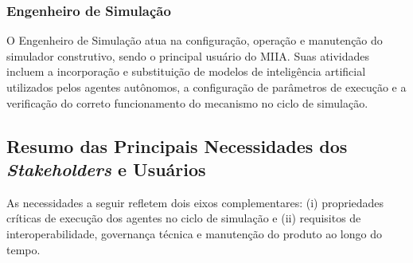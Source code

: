 \subsubsection{Engenheiro de Simulação}

O Engenheiro de Simulação atua na configuração, operação e manutenção do simulador construtivo, sendo o principal usuário do MIIA. Suas atividades incluem a incorporação e substituição de modelos de inteligência artificial utilizados pelos agentes autônomos, a configuração de parâmetros de execução e a verificação do correto funcionamento do mecanismo no ciclo de simulação.

\subsection{Resumo das Principais Necessidades dos \emph{Stakeholders} e Usuários}

As necessidades a seguir refletem dois eixos complementares: (i) propriedades críticas de execução dos agentes no ciclo de simulação e (ii) requisitos de interoperabilidade, governança técnica e manutenção do produto ao longo do tempo.

